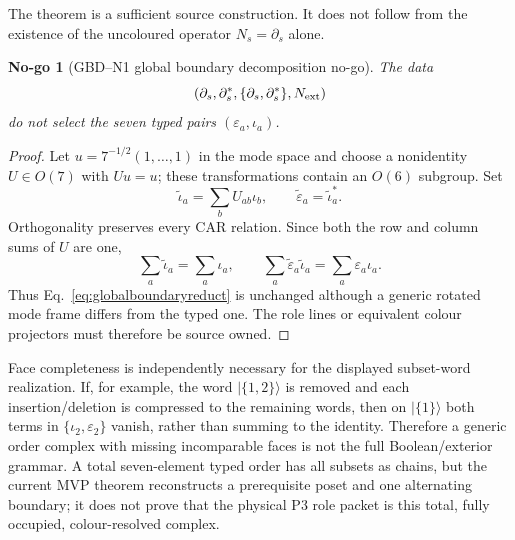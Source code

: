 \documentclass[11pt,a4paper]{article}
\newtheorem{nogo}[definition]{No-go}
\theoremstyle{remark}
\begin{document}
The theorem is a sufficient source construction.  It does not follow from
the existence of the uncoloured operator $N_s=\partial_s$ alone.

\begin{nogo}[GBD--N1 global boundary decomposition no-go]
The data
\begin{equation}
 (\partial_s,\partial_s^*,\{\partial_s,\partial_s^*\},N_{\rm ext})
 \label{eq:globalboundaryreduct}
\end{equation}
do not select the seven typed pairs $(\varepsilon_a,\iota_a)$.
\end{nogo}

\begin{proof}
Let $u=7^{-1/2}(1,\ldots,1)$ in the mode space and choose a nonidentity
$U\in O(7)$ with $Uu=u$; these transformations contain an $O(6)$ subgroup.
Set
\begin{equation}
 \widetilde\iota_a=\sum_bU_{ab}\iota_b,
 \qquad
 \widetilde\varepsilon_a=\widetilde\iota_a^*.
 \label{eq:rotatedcar}
\end{equation}
Orthogonality preserves every CAR relation.  Since both the row and column
sums of $U$ are one,
\begin{equation}
 \sum_a\widetilde\iota_a=\sum_a\iota_a,
 \qquad
 \sum_a\widetilde\varepsilon_a\widetilde\iota_a
 =\sum_a\varepsilon_a\iota_a.
 \label{eq:fixedglobaldata}
\end{equation}
Thus Eq.~\eqref{eq:globalboundaryreduct} is unchanged although a generic
rotated mode frame differs from the typed one.  The role lines or equivalent
colour projectors must therefore be source owned.
\end{proof}

Face completeness is independently necessary for the displayed subset-word
realization.  If, for example, the word $|\{1,2\}\rangle$ is removed and
each insertion/deletion is compressed to the remaining words, then on
$|\{1\}\rangle$ both terms in
$\{\iota_2,\varepsilon_2\}$ vanish, rather than summing to the identity.
Therefore a generic order complex with missing incomparable faces is not the
full Boolean/exterior grammar.  A total seven-element typed order has all
subsets as chains, but the current MVP theorem reconstructs a prerequisite
poset and one alternating boundary; it does not prove that the physical
P3 role packet is this total, fully occupied, colour-resolved complex.
\end{document}
